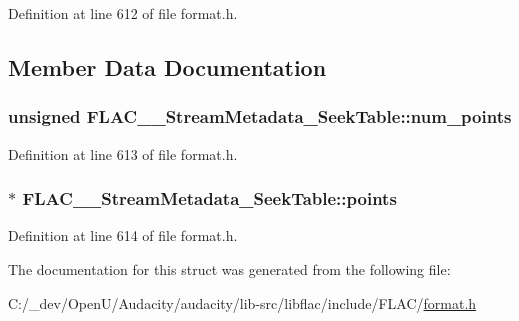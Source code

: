 Definition at line 612 of file format.\+h.



\subsection{Member Data Documentation}
\subsubsection[{\texorpdfstring{num\+\_\+points}{num_points}}]{\setlength{\rightskip}{0pt plus 5cm}unsigned F\+L\+A\+C\+\_\+\+\_\+\+Stream\+Metadata\+\_\+\+Seek\+Table\+::num\+\_\+points}\hypertarget{struct_f_l_a_c_____stream_metadata___seek_table_a12dcdb596297c199fe6cffa27a64e69f}{}\label{struct_f_l_a_c_____stream_metadata___seek_table_a12dcdb596297c199fe6cffa27a64e69f}


Definition at line 613 of file format.\+h.

\subsubsection[{\texorpdfstring{points}{points}}]{$\ast$ F\+L\+A\+C\+\_\+\+\_\+\+Stream\+Metadata\+\_\+\+Seek\+Table\+::points}\hypertarget{struct_f_l_a_c_____stream_metadata___seek_table_a0bf04ada03ea708dba9d31cd6c6159b8}{}\label{struct_f_l_a_c_____stream_metadata___seek_table_a0bf04ada03ea708dba9d31cd6c6159b8}


Definition at line 614 of file format.\+h.



The documentation for this struct was generated from the following file\+:\begin{DoxyCompactItemize}
\item 
C\+:/\+\_\+dev/\+Open\+U/\+Audacity/audacity/lib-\/src/libflac/include/\+F\+L\+A\+C/\hyperlink{include_2_f_l_a_c_2format_8h}{format.\+h}\end{DoxyCompactItemize}

